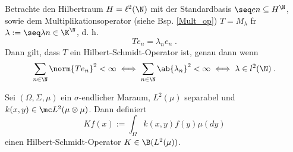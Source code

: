 \begin{ex}
	Betrachte den Hilbertraum \(H = \ell^2(\N)\) mit der Standardbasis \(\seq en \subseteq H^\N\), sowie dem Multiplikationsoperator (siehe Bsp. \ref{Mult_op}) \(T = M_\lambda\) f\us r \(\lambda := \seq \lambda n \in \K^\N\), d. h. 
	\[T e_n = \lambda_n e_n\;.\]
	Dann gilt, dass $T$ ein Hilbert-Schmidt-Operator ist, genau dann wenn
	\[\sum_{n\in\N}\norm{Te_n}^2 < \infty \iff \sum_{n\in\N}\ab{\lambda_n}^2 < \infty \iff \lambda \in l^2(\N)\;.\]
\end{ex}

\begin{theorem}
	Sei \((\Omega, \Sigma, \mu)\) ein \(\sigma\)-endlicher Ma\s raum, \(L^2(\mu)\) separabel und \(k(x,y)\in \mc L^2(\mu\otimes \mu)\). Dann definiert 
	\[K f(x) := \int_\Omega k(x,y) f(y) \mu (dy)\]
	einen Hilbert-Schmidt-Operator \(K\in \B(L^2(\mu))\).
\end{theorem}
